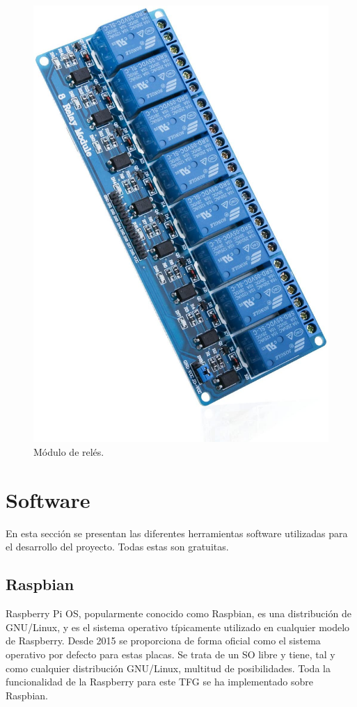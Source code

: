 \documentclass[a4paper, 12pt, oneside]{book}
\begin{document}
\begin{figure}[H]
\begin{minipage}[b]{0.4\textwidth}
    \includegraphics[width=\textwidth]{img/reles}
    \caption{Módulo de relés.}
    \label{figura:reles}
  \end{minipage}
\end{figure}
 

\section{Software}
\label{software}
En esta sección se presentan las diferentes herramientas software utilizadas para el desarrollo del proyecto. Todas estas son gratuitas.

\subsection{Raspbian}
\label{subsec:raspbian}
Raspberry Pi OS, popularmente conocido como Raspbian, es una distribución de GNU/Linux, y es el sistema operativo típicamente utilizado en cualquier modelo de Raspberry. Desde 2015 se proporciona de forma oficial como el sistema operativo por defecto para estas placas.
Se trata de un SO libre y tiene, tal y como cualquier distribución GNU/Linux, multitud de posibilidades.
Toda la funcionalidad de la Raspberry para este TFG se ha implementado sobre Raspbian.
\end{document}

